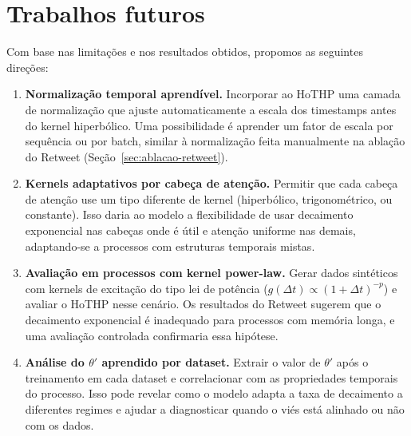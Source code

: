 \section{Trabalhos futuros}

Com base nas limitações e nos resultados obtidos, propomos as seguintes direções:

\begin{enumerate}
    \item \textbf{Normalização temporal aprendível.} Incorporar ao HoTHP uma camada de normalização que ajuste automaticamente a escala dos timestamps antes do kernel hiperbólico. Uma possibilidade é aprender um fator de escala por sequência ou por batch, similar à normalização feita manualmente na ablação do Retweet (Seção~\ref{sec:ablacao-retweet}).

    \item \textbf{Kernels adaptativos por cabeça de atenção.} Permitir que cada cabeça de atenção use um tipo diferente de kernel (hiperbólico, trigonométrico, ou constante). Isso daria ao modelo a flexibilidade de usar decaimento exponencial nas cabeças onde é útil e atenção uniforme nas demais, adaptando-se a processos com estruturas temporais mistas.

    \item \textbf{Avaliação em processos com kernel power-law.} Gerar dados sintéticos com kernels de excitação do tipo lei de potência ($g(\Delta t) \propto (1+\Delta t)^{-p}$) e avaliar o HoTHP nesse cenário. Os resultados do Retweet sugerem que o decaimento exponencial é inadequado para processos com memória longa, e uma avaliação controlada confirmaria essa hipótese.

    \item \textbf{Análise do $\theta'$ aprendido por dataset.} Extrair o valor de $\theta'$ após o treinamento em cada dataset e correlacionar com as propriedades temporais do processo. Isso pode revelar como o modelo adapta a taxa de decaimento a diferentes regimes e ajudar a diagnosticar quando o viés está alinhado ou não com os dados.
\end{enumerate}
